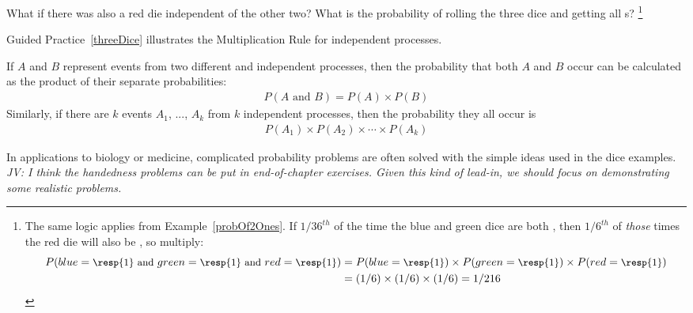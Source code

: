 \begin{doublespace}
\begin{exercise}{What if there was also a red die independent of the other two? What is the probability of rolling the three dice and getting all s?}\label{threeDice}
\footnote{The same logic applies from Example~\ref{probOf2Ones}. If $1/36^{th}$ of the time the blue and green dice are both , then $1/6^{th}$ of \emph{those} times the red die will also be , so multiply:
{\begin{align*}
P(blue=\text{\small\resp{1} and } green=\text{\small\resp{1} and } red=\text{\small\resp{1}})
	&= P(blue=\text{\small\resp{1}})\times P(green=\text{\small\resp{1}})\times P(red=\text{\small\resp{1}}) \\
	&= (1/6)\times (1/6)\times (1/6)
	= 1/216
\end{align*}} \vspace{-7mm}
}
\end{exercise}

Guided Practice~\ref{threeDice} illustrates the Multiplication Rule for independent processes. 

\begin{termBox}{
If $A$ and $B$ represent events from two different and independent processes, then the probability that both $A$ and $B$ occur can be calculated as the product of their separate probabilities: \vspace{-1.5mm}
\begin{eqnarray}\label{eqForIndependentEvents}
P(A \text{ and }B) = P(A) \times  P(B)
\end{eqnarray}
Similarly, if there are $k$ events $A_1$, ..., $A_k$ from $k$ independent processes, then the probability they all occur is\vspace{-1.5mm}
\begin{eqnarray*}
P(A_1) \times  P(A_2)\times  \cdots \times  P(A_k)
\end{eqnarray*}\vspace{-6mm}}
\end{termBox}

In applications to biology or medicine, complicated probability problems are often solved with the simple ideas used in the dice examples. \textit{JV: I think the handedness problems can be put in end-of-chapter exercises. Given this kind of lead-in, we should focus on demonstrating some realistic problems.}

\end{doublespace}
